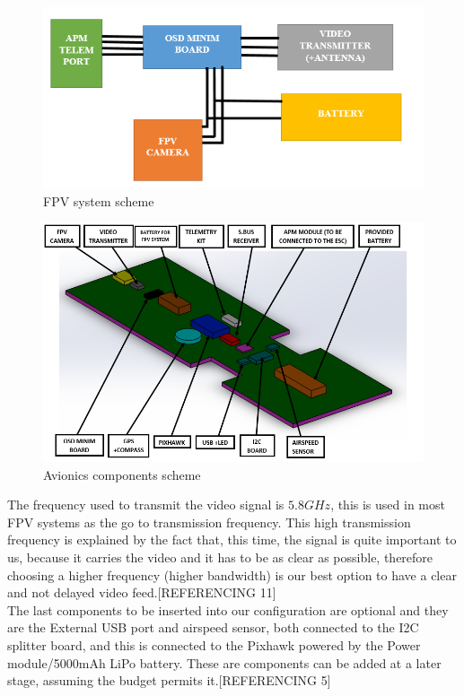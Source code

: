 \documentclass[12pt]{article}
\begin{document}
\begin{figure}[h]
    \centering
    \includegraphics[width=0.70\linewidth]{Diagram.png}
    \caption{FPV system scheme}
    \label{fig:FPV system}
\end{figure}

\begin{figure}[h!]
    \centering
    \includegraphics[width=1\linewidth]{components.png}
    \caption{Avionics components scheme}
    \label{fig:Avionics}
\end{figure}

\noindent The frequency used to transmit the video signal is $5.8GHz$, this is used in most FPV systems as the go to transmission frequency. This high transmission frequency is explained by the fact that, this time, the signal is quite important to us, because it carries the video and it has to be as clear as possible, therefore choosing a higher frequency (higher bandwidth) is our best option to have a clear and not delayed video feed.[REFERENCING 11] \\

\noindent The last components to be inserted into our configuration are optional and they are the External USB port and airspeed sensor, both connected to the I2C splitter board, and this is connected to the Pixhawk powered by the Power module/5000mAh LiPo battery. These are components can be added at a later stage, assuming the budget permits it.[REFERENCING 5] \\
\end{document}
